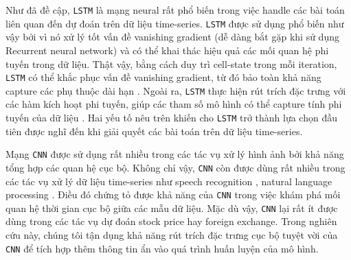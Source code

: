 \documentclass[aps,prb,groupedaddress,twocolumn,showpacs,dvipdfmx,superscriptaddress,pdftex]{revtex4-2}
\begin{document}
Như đã đề cập, \verb|LSTM| là mạng neural rất phổ biến trong việc handle các bài toán liên quan đến dự đoán trên dữ liệu time-series. \verb|LSTM| được sử dụng phổ biến như vậy bởi vì nó xử lý tốt vấn đề vanishing gradient (dễ dàng bắt gặp khi sử dụng Recurrent neural network) và có thể khai thác hiệu quả các mối quan hệ phi tuyến trong dữ liệu. Thật vậy, bằng cách duy trì cell-state trong mỗi iteration, \verb|LSTM| có thể khắc phục vấn đề vanishing gradient, từ đó bảo toàn khả năng capture các phụ thuộc dài hạn \cite{cheng2018applied}. Ngoài ra, \verb|LSTM| thực hiện rút trích đặc trưng với các hàm kích hoạt phi tuyến, giúp các tham số mô hình có thể capture tính phi tuyến của dữ liệu \cite{he2016exploiting}. Hai yếu tố nêu trên khiến cho \verb|LSTM| trở thành lựa chọn đầu tiên được nghĩ đến khi giải quyết các bài toán trên dữ liệu time-series.


\vspace{2mm}

Mạng \verb|CNN| được sử dụng rất nhiều trong các tác vụ xử lý hình ảnh \citep{naranjo2020review, sharma2018analysis} bởi khả năng tổng hợp các quan hệ cục bộ. Không chỉ vậy, \verb|CNN| còn được dùng rất nhiều trong các tác vụ xử lý dữ liệu time-series như speech recognition \cite{dua2022developing}, natural language processing \cite{varshitha2023natural}. Điều đó chứng tỏ được khả năng của \verb|CNN| trong việc khám phá mối quan hệ thời gian cục bộ giữa các mẫu dữ liệu. Mặc dù vậy, \verb|CNN| lại rất ít được dùng trong các tác vụ dự đoán stock price hay foreign exchange. Trong nghiên cứu này, chúng tôi tận dụng khả năng rút trích đặc trưng cục bộ tuyệt vời của \verb|CNN| để tích hợp thêm thông tin ẩn vào quá trình huấn luyện của mô hình.
\end{document}
